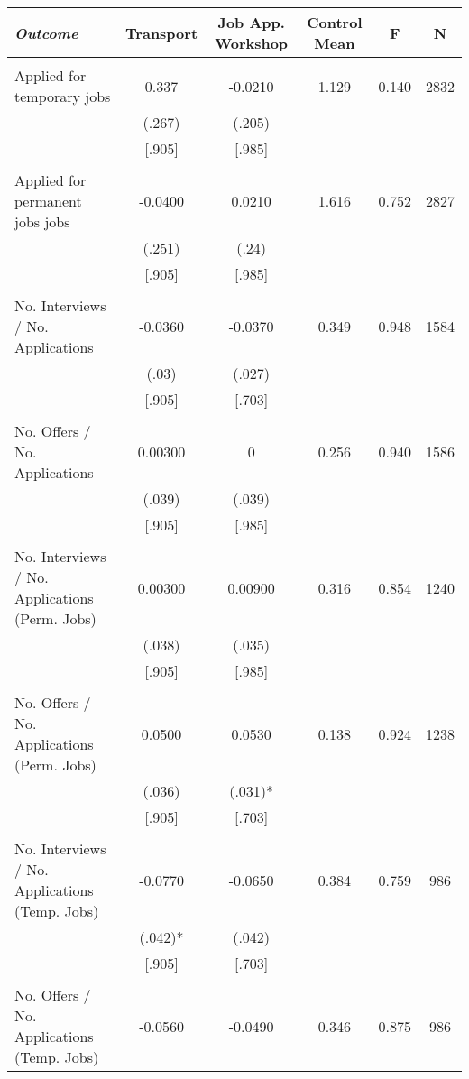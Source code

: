 \begin{tabular}{lccccc} \hline
\multicolumn{1}{l}{\emph{Outcome}} & \multicolumn{1}{c}{Transport} &\multicolumn{1}{c}{Job App. Workshop} & \multicolumn{1}{c}{Control Mean} & \multicolumn{1}{c}{F} & \multicolumn{1}{c}{N} \\ \hline \\
Applied for temporary jobs & 0.337 & -0.0210 & 1.129 & 0.140 & 2832 \\
& (.267) & (.205) &  &  &  \\
& [.905] & [.985] &  &  &  \\
&  &  &  &  &  \\
Applied for permanent jobs jobs & -0.0400 & 0.0210 & 1.616 & 0.752 & 2827 \\
& (.251) & (.24) &  &  &  \\
& [.905] & [.985] &  &  &  \\
&  &  &  &  &  \\
No. Interviews / No. Applications & -0.0360 & -0.0370 & 0.349 & 0.948 & 1584 \\
& (.03) & (.027) &  &  &  \\
& [.905] & [.703] &  &  &  \\
&  &  &  &  &  \\
No. Offers / No. Applications & 0.00300 & 0 & 0.256 & 0.940 & 1586 \\
& (.039) & (.039) &  &  &  \\
& [.905] & [.985] &  &  &  \\
&  &  &  &  &  \\
No. Interviews / No. Applications (Perm. Jobs) & 0.00300 & 0.00900 & 0.316 & 0.854 & 1240 \\
& (.038) & (.035) &  &  &  \\
& [.905] & [.985] &  &  &  \\
&  &  &  &  &  \\
No. Offers / No. Applications (Perm. Jobs) & 0.0500 & 0.0530 & 0.138 & 0.924 & 1238 \\
& (.036) & (.031)* &  &  &  \\
& [.905] & [.703] &  &  &  \\
&  &  &  &  &  \\
No. Interviews / No. Applications (Temp. Jobs) & -0.0770 & -0.0650 & 0.384 & 0.759 & 986 \\
& (.042)* & (.042) &  &  &  \\
& [.905] & [.703] &  &  &  \\
&  &  &  &  &  \\
No. Offers / No. Applications (Temp. Jobs) & -0.0560 & -0.0490 & 0.346 & 0.875 & 986 \\

\end{tabular}

